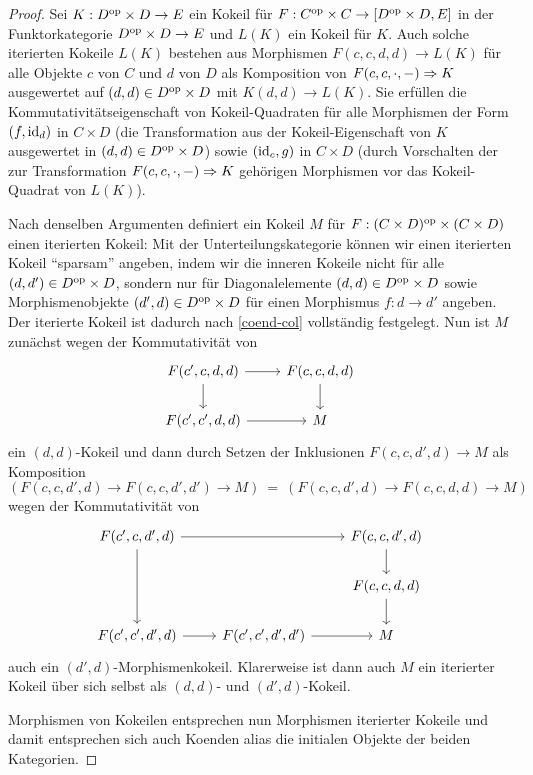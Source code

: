 \begin{proof}
  Sei $K: D^\mathrm{op} \times D \to E$ ein Kokeil für $F: C^\mathrm{op} \times C \to
  [D^\mathrm{op} \times D, E]$ in der Funktorkategorie $D^\mathrm{op} \times D \to E$
  und $L(K)$ ein Kokeil für $K$. Auch solche iterierten Kokeile $L(K)$
  bestehen aus Morphismen $F(c, c, d, d) \to L(K)$ für alle Objekte
  $c$ von $C$ und $d$ von $D$ als Komposition von $F(c, c, \cdot, -)
  \Rightarrow K$ ausgewertet auf $(d, d) \in D^\mathrm{op} \times D$ mit $K(d, d)
  \to L(K)$. Sie erfüllen die Kommutativitätseigenschaft von
  Kokeil-Quadraten für alle Morphismen der Form $(f, \operatorname{id}_d)$ in $C
  \times D$ (die Transformation aus der Kokeil-Eigenschaft von $K$
  ausgewertet in $(d, d) \in D^\mathrm{op} \times D$) sowie $(\operatorname{id}_c, g)$ in $C
  \times D$ (durch Vorschalten der zur Transformation $F(c, c, \cdot,
  -) \Rightarrow K$ gehörigen Morphismen vor das Kokeil-Quadrat von
  $L(K)$).

  Nach denselben Argumenten definiert ein Kokeil $M$ für $F: (C \times
  D)^\mathrm{op} \times (C \times D)$ einen iterierten Kokeil: Mit der
  Unterteilungskategorie können wir einen iterierten Kokeil
  ``sparsam'' angeben, indem wir die inneren Kokeile nicht für alle
  $(d, d') \in D^\mathrm{op} \times D$, sondern nur für Diagonalelemente $(d,
  d) \in D^\mathrm{op} \times D$ sowie Morphismenobjekte $(d', d) \in D^\mathrm{op}
  \times D$ für einen Morphismus $f: d \to d'$ angeben. Der iterierte
  Kokeil ist dadurch nach \ref{coend-col} vollständig festgelegt. Nun
  ist $M$ zunächst wegen der Kommutativität von
  \[ \begin{tikzcd}
    F(c', c, d, d) \arrow{r} \arrow{d} & F(c, c, d, d) \arrow{d} \\
    F(c', c', d, d) \arrow{r} & M
  \end{tikzcd} \]
  ein $(d, d)$-Kokeil und dann durch Setzen der Inklusionen $F(c, c,
  d', d) \to M$ als Komposition
  \[ (F(c, c, d', d) \to F(c, c, d', d') \to M)
  \: = \: (F(c, c, d', d) \to F(c, c, d, d) \to M)
  \]
  wegen der Kommutativität von
  \[ \begin{tikzcd}
    F(c', c, d', d) \arrow{rr} \arrow{dd} & & F(c, c, d', d) \arrow{d} \\
    & & F(c, c, d, d) \arrow{d} \\
    F(c', c', d', d) \arrow{r} & F(c', c', d', d') \arrow{r} & M
  \end{tikzcd} \]
  auch ein $(d', d)$-Morphismenkokeil. Klarerweise ist dann auch $M$
  ein iterierter Kokeil über sich selbst als $(d, d)$- und $(d',
  d)$-Kokeil.

  Morphismen von Kokeilen entsprechen nun Morphismen iterierter
  Kokeile und damit entsprechen sich auch Koenden alias die initialen
  Objekte der beiden Kategorien.
\end{proof}
